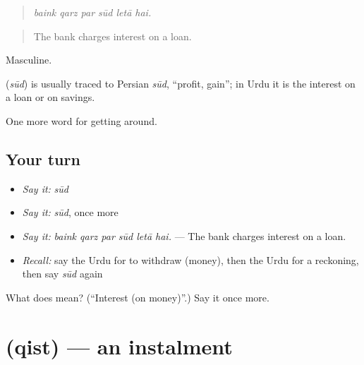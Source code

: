 \begin{quote}
     
\end{quote}

\begin{quote}
\emph{baink qarz par sūd letā hai.}
\end{quote}

\begin{quote}
The bank charges interest on a loan.
\end{quote}

Masculine.

\begin{cousinweb}
\textbf{} (\emph{sūd}) is usually traced to Persian \emph{sūd}, \textquotedblleft{}profit, gain\textquotedblright{}; in Urdu it is the interest on a loan or on savings.
\end{cousinweb}

\begin{grammarlens}[title={What you've built}]
One more word for getting around.
\end{grammarlens}

\subsection*{Your turn}
\begin{itemize}
\raggedright
  \item \emph{Say it:} \emph{sūd}
  \item \emph{Say it:} \emph{sūd}, once more
  \item \emph{Say it:} \emph{baink qarz par sūd letā hai.} — The bank charges interest on a loan.
  \item \emph{Recall:} say the Urdu for to withdraw (money), then the Urdu for a reckoning, then say \emph{sūd} again
\end{itemize}

\begin{tcolorbox}[breakable,colback=teal!4,colframe=teal!35!black,title={Before you move on}]
What does  mean? (\textquotedblleft{}Interest (on money)\textquotedblright{}.) Say it once more.
\end{tcolorbox}
\section[\texorpdfstring{\ur{قسط} (qist)}{قسط (qist)}]{ (qist) — an instalment}

\label{lesson:UR-C418-qist}



